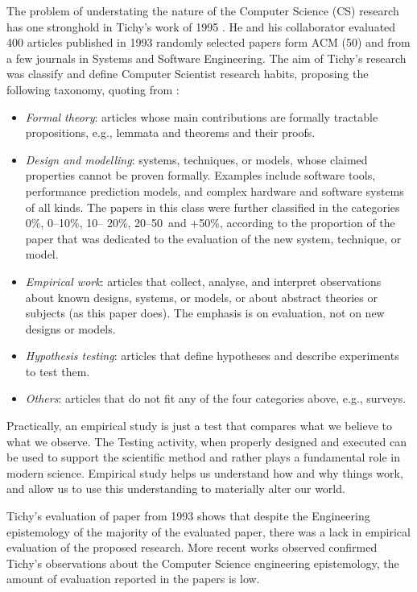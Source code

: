 The problem of understating the nature of the Computer Science (CS) research has one stronghold in Tichy's work of 1995 \cite{Tichy:1995:EEC:209090.209093}. He and his collaborator evaluated 400 articles published in 1993 randomly selected papers form ACM (50) and from a few journals in Systems and Software Engineering. The aim of Tichy's research was classify and define Computer Scientist research habits, proposing the following taxonomy, quoting from \cite{Tichy:1995:EEC:209090.209093}:
\begin{itemize}
\item \textit{Formal theory}: articles whose main contributions are formally tractable propositions, e.g., lemmata and theorems and their proofs.
\item \textit{Design and modelling}: systems, techniques, or models, whose claimed properties cannot be proven formally. Examples include software tools, performance prediction models, and complex hardware and software systems of all kinds. The papers in this class were further classified in the categories 0\%, 0–10\%, 10– 20\%, 20–50\, and +50\%, according to the proportion of the paper that was dedicated to the evaluation of the new system, technique, or model.
\item \textit{Empirical work}: articles that collect, analyse, and interpret observations about known designs, systems, or models, or about abstract theories or subjects (as this paper does). The emphasis is on evaluation, not on new designs or models.
\item \textit{Hypothesis testing}: articles that define hypotheses and describe experiments to test them.
\item \textit{Others}: articles that do not fit any of the four categories above, e.g., surveys.
\end{itemize}

Practically, an empirical study is just a test that compares what we believe to what we observe. The Testing activity, when properly designed and executed can be used to support the scientific method and rather plays a fundamental role in modern science. Empirical study helps us understand how and why things work, and allow us to use this understanding to materially alter our world.

Tichy's evaluation of paper from 1993 shows that despite the Engineering epistemology of the majority of the evaluated paper, there was a lack in empirical evaluation of the proposed research. More recent works \cite{Wainer:2009:EEC:1518331.1518552} observed confirmed Tichy's observations about the Computer Science engineering epistemology, the amount of evaluation reported in the papers is low.

